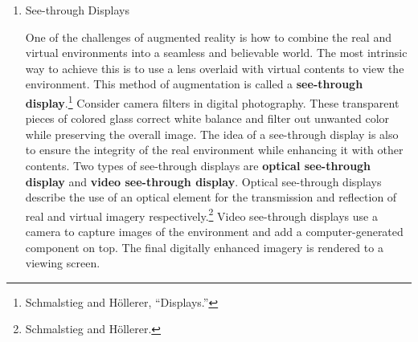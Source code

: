 \begin{enumerate}
	\item See-through Displays

One of the challenges of augmented reality is how to combine the real and virtual environments into a seamless and believable world. The most intrinsic way to achieve this is to use a lens overlaid with virtual contents to view the environment. This method of augmentation is called a \textbf{see-through display}.\footnote{Schmalstieg and Höllerer, “Displays.”} Consider camera filters in digital photography. These transparent pieces of colored glass correct white balance and filter out unwanted color while preserving the overall image. The idea of a see-through display is also to ensure the integrity of the real environment while enhancing it with other contents. Two types of see-through displays are \textbf{optical see-through display} and \textbf{video see-through display}. Optical see-through displays describe the use of an optical element for the transmission and reflection of real and virtual imagery respectively.\footnote{Schmalstieg and Höllerer.} Video see-through displays use a camera to capture images of the environment and add a computer-generated component on top. The final digitally enhanced imagery is rendered to a viewing screen.

\begin{figure}[!ht]
\end{figure}

\begin{figure}[!ht]
\end{figure}


\end{enumerate}
